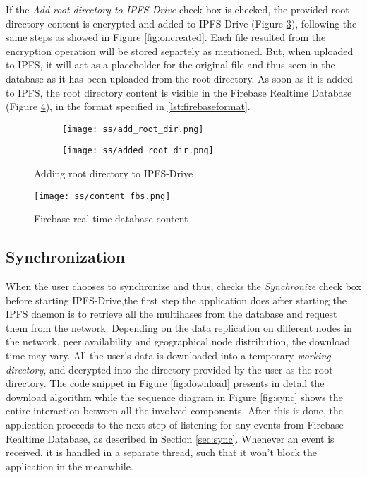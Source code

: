 \documentclass[12pt]{report}
\begin{document}
If the \textit{Add root directory to IPFS-Drive} check box is checked, the provided root directory content is encrypted and added to IPFS-Drive (Figure \ref{fig:addrootdir}), following the same steps as showed in Figure \ref{fig:oncreated}. Each file resulted from the encryption operation will be stored separtely as mentioned. But, when uploaded to IPFS, it will act as a placeholder for the original file and thus seen in the database as it has been uploaded from the root directory. As soon as it is added to IPFS, the root directory content is visible in the Firebase Realtime Database (Figure \ref{fig:contentfbs}), in the format specified in \ref{lst:firebaseformat}.


\begin{figure}[H]
  \begin{subfigure}{0.47\textwidth}
    \texttt{[image: ss/add\_root\_dir.png]}
    \label{fig:addingrootdir}
\caption{}
  \end{subfigure}
 \hfill
  \begin{subfigure}{0.47\textwidth}
    \texttt{[image: ss/added\_root\_dir.png]}
    \label{fig:addedrootdir}
\caption{}
  \end{subfigure}
\caption{Adding root directory to IPFS-Drive}
 \label{fig:addrootdir}
\end{figure}

\begin{figure}[H]
\centerline{\texttt{[image: ss/content\_fbs.png]}}
    \caption{Firebase real-time database content}
    \label{fig:contentfbs}
\end{figure}

\subsection{Synchronization}

When the user chooses to synchronize and thus, checks the \textit{Synchronize} check box before starting IPFS-Drive,the first step the application does after starting the IPFS daemon is to retrieve all the multihases from the database and request them from the network. Depending on the data replication on different nodes in the network, peer availability and geographical node distribution, the download time may vary. All the user's data is downloaded into a temporary \textit{working directory}, and decrypted into the directory provided by the user as the root directory. The code snippet in Figure \ref{fig:download} presents in detail the download algorithm while the sequence diagram in Figure \ref{fig:sync} shows the entire interaction between all the involved components. After this is done, the application proceeds to the next step of listening for any events from Firebase Realtime Database, as described in Section \ref{sec:sync}. Whenever an event is received, it is handled in a separate thread, such that it won't block the application in the meanwhile.
\end{document}
